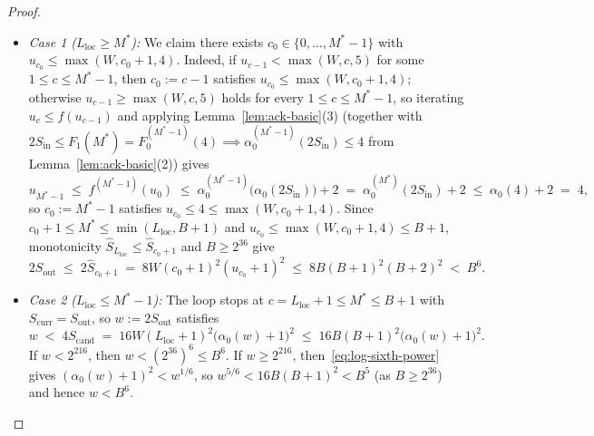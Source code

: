 \documentclass[11pt]{article}
\theoremstyle{definition}
\theoremstyle{remark}
\begin{document}
\begin{proof}
\begin{itemize}[leftmargin=2em]
  \item \emph{Case 1 ($L_{\mathrm{loc}} \ge M^*$):} We claim there exists $c_0 \in \{0, \dots, M^* - 1\}$ with $u_{c_0} \le \max(W, c_0 + 1, 4)$. Indeed, if $u_{c-1} < \max(W, c, 5)$ for some $1 \le c \le M^* - 1$, then $c_0 := c - 1$ satisfies $u_{c_0} \le \max(W, c_0 + 1, 4)$; otherwise $u_{c-1} \ge \max(W, c, 5)$ holds for every $1 \le c \le M^* - 1$, so iterating $u_c \le f(u_{c-1})$ and applying Lemma~\ref{lem:ack-basic}(3) (together with $2 S_{\mathrm{in}} \le F_1(M^*) = F_0^{(M^* - 1)}(4) \implies \alpha_0^{(M^* - 1)}(2 S_{\mathrm{in}}) \le 4$ from Lemma~\ref{lem:ack-basic}(2)) gives
  \[
  u_{M^* - 1} \;\le\; f^{(M^* - 1)}(u_0) \;\le\; \alpha_0^{(M^* - 1)}\big(\alpha_0(2 S_{\mathrm{in}})\big) + 2 \;=\; \alpha_0^{(M^*)}(2 S_{\mathrm{in}}) + 2 \;\le\; \alpha_0(4) + 2 \;=\; 4,
  \]
  so $c_0 := M^* - 1$ satisfies $u_{c_0} \le 4 \le \max(W, c_0 + 1, 4)$. Since $c_0 + 1 \le M^* \le \min(L_{\mathrm{loc}}, B + 1)$ and $u_{c_0} \le \max(W, c_0 + 1, 4) \le B + 1$, monotonicity $\widehat{S}_{L_{\mathrm{loc}}} \le \widehat{S}_{c_0 + 1}$ and $B \ge 2^{36}$ give
  \[
  2 S_{\mathrm{out}} \;\le\; 2 \widehat{S}_{c_0 + 1} \;=\; 8 W (c_0 + 1)^2 (u_{c_0} + 1)^2 \;\le\; 8 B (B + 1)^2 (B + 2)^2 \;<\; B^6.
  \]
  \item \emph{Case 2 ($L_{\mathrm{loc}} \le M^* - 1$):} The loop stops at $c = L_{\mathrm{loc}} + 1 \le M^* \le B + 1$ with $S_{\mathrm{curr}} = S_{\mathrm{out}}$, so $w := 2 S_{\mathrm{out}}$ satisfies
  \[
  w \;<\; 4 S_{\mathrm{cand}} \;=\; 16 W (L_{\mathrm{loc}} + 1)^2 \big(\alpha_0(w) + 1\big)^2 \;\le\; 16 B (B + 1)^2 \big(\alpha_0(w) + 1\big)^2.
  \]
  If $w < 2^{216}$, then $w < (2^{36})^6 \le B^6$. If $w \ge 2^{216}$, then~\eqref{eq:log-sixth-power} gives $(\alpha_0(w) + 1)^2 < w^{1/6}$, so $w^{5/6} < 16 B (B + 1)^2 < B^5$ (as $B \ge 2^{36}$) and hence $w < B^6$.
\end{itemize}


\end{proof}
\end{document}
